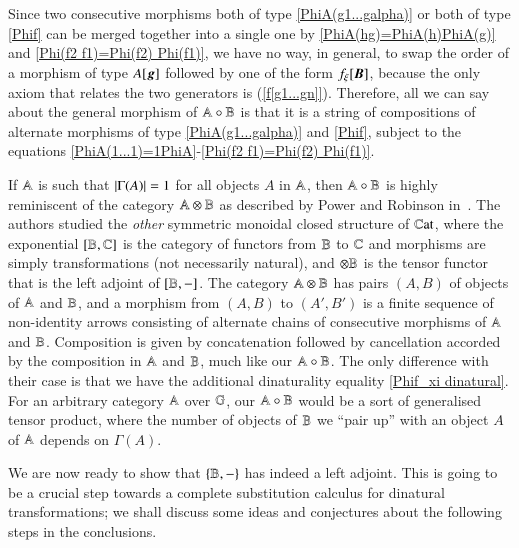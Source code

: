 Since two consecutive morphisms both of type \ref{PhiA(g1...galpha)} or both of type \ref{Phif} can be merged together into a single one by \ref{PhiA(hg)=PhiA(h)PhiA(g)} and \ref{Phi(f2 f1)=Phi(f2) Phi(f1)}, we have no way, in general, to swap the order of a morphism of type $A[{\boldsymbol g}]$ followed by one of the form $f_\xi[{\boldsymbol B}]$, because the only axiom that relates the two generators is (\ref{f[g1...gn]}). Therefore, all we can say about the general morphism of $\mathbb A \circ \mathbb B$ is that it is a string of compositions of alternate morphisms of type \ref{PhiA(g1...galpha)}  and \ref{Phif}, subject to the equations \ref{PhiA(1...1)=1PhiA}-\ref{Phi(f2 f1)=Phi(f2) Phi(f1)}. 

\begin{remark}
    If $\mathbb A$ is such that $\lvert \Gamma(A) \rvert=1$ for all objects $A$ in $\mathbb A$, then $\mathbb A \circ \mathbb B$ is highly reminiscent of the category $\mathbb A \otimes \mathbb B$ as described by Power and Robinson in~\cite{power_premonoidal_1997}. The authors studied the \emph{other} symmetric monoidal closed structure of $\mathbb{C}\mathrm{at}$, where the exponential $[\mathbb B,\mathbb C]$ is the category of functors from $\mathbb B$ to $\mathbb C$ and morphisms are simply transformations (not necessarily natural), and $\otimes \mathbb B$ is the tensor functor that is the left adjoint of $[\mathbb B,-]$. The category $\mathbb A \otimes \mathbb B$ has pairs $(A,B)$ of objects of $\mathbb A$ and $\mathbb B$, and a morphism from $(A,B)$ to $(A',B')$ is a finite sequence of non-identity arrows consisting of alternate chains of consecutive morphisms of $\mathbb A$ and $\mathbb B$. Composition is given by concatenation followed by cancellation accorded by the composition in $\mathbb A$ and $\mathbb B$, much like our $\mathbb A \circ \mathbb B$. The only difference with their case is that we have the additional dinaturality equality \ref{Phif_xi dinatural}. For an arbitrary category $\mathbb A$ over $\mathbb G$, our $\mathbb A \circ \mathbb B$ would be a sort of generalised tensor product, where the number of objects of $\mathbb B$ we ``pair up'' with an object $A$ of $\mathbb A$ depends on $\Gamma(A)$.
\end{remark}

We are now ready to show that $\{ \mathbb B,-\}$ has indeed a left adjoint. This is going to be a crucial step towards a complete substitution calculus for dinatural transformations; we shall discuss some ideas and conjectures about the following steps in the conclusions.

